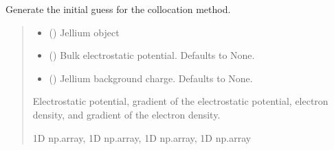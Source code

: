 \documentclass[letterpaper,10pt,english]{sphinxmanual}
\begin{document}
\begin{fulllineitems}
\label{\detokenize{fcdft.jellium:fcdft.jellium.jellium.init_guess}}
\pysigstartsignatures
\pysiglinewithargsret
{}
{\sphinxparamcomma {}\sphinxparamcomma {}}
{}
\pysigstopsignatures
\sphinxAtStartPar
Generate the initial guess for the collocation method.
\begin{quote}\begin{description}
\begin{itemize}
\item {} 
\sphinxAtStartPar
{} () \textendash{} Jellium object

\item {} 
\sphinxAtStartPar
{} (\sphinxstyleliteralemphasis{\sphinxupquote{, }}) \textendash{} Bulk electrostatic potential. Defaults to None.

\item {} 
\sphinxAtStartPar
{} (\sphinxstyleliteralemphasis{\sphinxupquote{, }}) \textendash{} Jellium background charge. Defaults to None.

\end{itemize}

\sphinxAtStartPar
Electrostatic potential, gradient of the electrostatic potential, electron density, and gradient of the electron density.

\sphinxAtStartPar
1D np.array, 1D np.array, 1D np.array, 1D np.array

\end{description}\end{quote}

\end{fulllineitems}

\end{document}

